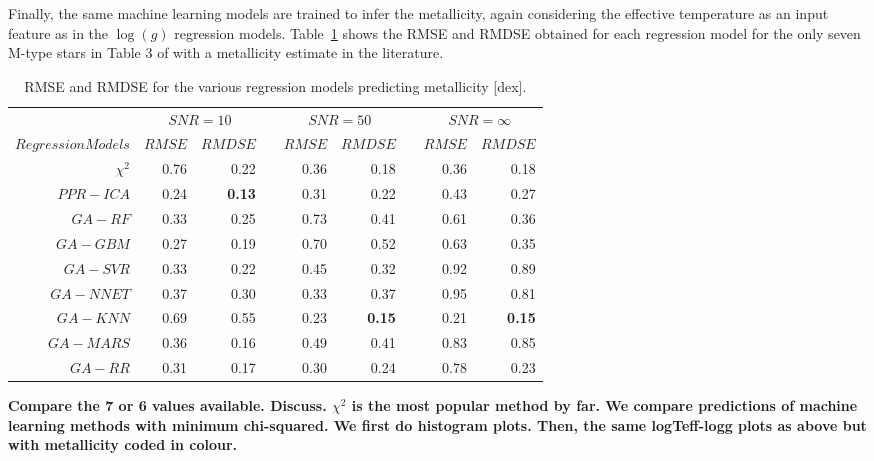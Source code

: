 Finally, the same machine learning models are trained to infer the
metallicity, again considering the effective temperature as an input
feature as in the $\log(g)$ regression
models. Table~\ref{tab:models_M_rmse} shows the RMSE and RMDSE
obtained for each regression model for the only seven M-type stars in
Table 3 of \cite{cesetti} with a metallicity estimate in the
literature.
%
%
\begin{table}\centering
\begin{tabular}{@{}rrrcrrcrr@{}}\toprule
& \multicolumn{2}{c}{$SNR = 10$} & \phantom{ab}& \multicolumn{2}{c}{$SNR = 50$} &
\phantom{ab} & \multicolumn{2}{c}{$SNR = \infty$}\\
\cmidrule{2-3} \cmidrule{5-6} \cmidrule{8-9}
$Regression Models$ & $RMSE$ & $RMDSE$ && $RMSE$ & $RMDSE$     && $RMSE$       & $RMDSE$ \\ \midrule
$\chi^2$    & 0.76 & 0.22      && 0.36 & 0.18     && 0.36 & 0.18 \\
$PPR-ICA$   & 0.24 & \bf{0.13} && 0.31 & 0.22     && 0.43 & 0.27 \\
$GA-RF$     & 0.33 & 0.25      && 0.73 & 0.41     && 0.61 & 0.36 \\
$GA-GBM$    & 0.27 & 0.19      && 0.70 & 0.52     && 0.63 & 0.35 \\
$GA-SVR$    & 0.33 & 0.22      && 0.45 & 0.32     && 0.92 & 0.89 \\
$GA-NNET$   & 0.37 & 0.30      && 0.33 & 0.37     && 0.95 & 0.81 \\
$GA-KNN$    & 0.69 & 0.55      && 0.23 & \bf{0.15}&& 0.21 & \bf{0.15} \\ 
$GA-MARS$   & 0.36 & 0.16      && 0.49 & 0.41     && 0.83 & 0.85 \\
$GA-RR$     & 0.31 & 0.17      && 0.30 & 0.24     && 0.78 & 0.23 \\

\bottomrule
\end{tabular}
\caption {RMSE and RMDSE for the various regression models predicting
  metallicity [dex].}
\label{tab:models_M_rmse} 
\end{table}

{\bf Compare the 7 or 6 values available. Discuss.  $\chi^2$ is
  the most popular method by far. We compare predictions of machine
  learning methods with minimum chi-squared. We first do histogram
  plots. Then, the same logTeff-logg plots as above but with
  metallicity coded in colour.}

